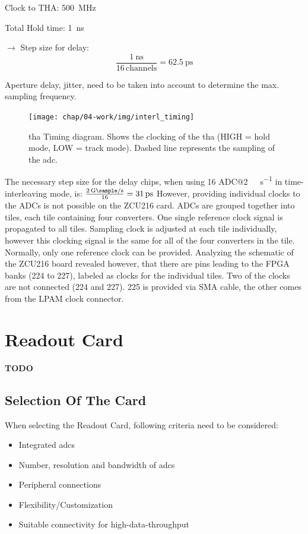 Clock to THA: \SI{500}{\mega \hertz}

Total Hold time: \SI{1}{\nano \second}

$\rightarrow$ Step size for delay:
\begin{equation}
	\frac{\SI{1}{\nano \second}}{16 \, \text{channels}} = \SI{62.5}{\pico \second}
\end{equation}

Aperture delay, jitter, need to be taken into account to determine the max. sampling frequency.
\begin{figure}
	\centering
	\tikzexternaldisable
	\texttt{[image: chap/04-work/img/interl\_timing]}
	\tikzexternalenable
	\caption[Track-And-Hold Timing diagram]{\gls{tha} Timing diagram. Shows the clocking of the \gls{tha} (HIGH = hold mode, LOW = track mode). Dashed line represents the sampling of the \gls{adc}.}
	\label{fig:THA}
\end{figure}

The necessary step size for the delay chips, when using 16 ADC@\SI{2}{\giga \sample \per \second} in time-interleaving mode, is: $\frac{\SI{2}{\giga \sample \per \second}}{16} = \SI{31}{\pico \second}$
However, providing individual clocks to the ADCs is not possible on the ZCU216 card. ADCs are grouped together into tiles, each tile containing four converters. One single reference clock signal is propagated to all tiles. Sampling clock is adjusted at each tile individually, however this clocking signal is the same for all of the four converters in the tile. Normally, only one reference clock can be provided. Analyzing the schematic of the ZCU216 board revealed however, that there are pins leading to the FPGA banks (224 to 227), labeled as clocks for the individual tiles. Two of the clocks are not connected (224 and 227). 225 is provided via SMA cable, the other comes from the LPAM clock connector. 

\section{Readout Card}
\textbf{TODO}
\subsection{Selection Of The Card}\label{sec:selection}
When selecting the Readout Card, following criteria need to be considered:
\begin{itemize}
	\item Integrated \glspl{adc}
	\item Number, resolution and bandwidth of \glspl{adc}
	\item Peripheral connections
	\item Flexibility/Customization
	\item Suitable connectivity for high-data-throughput
\end{itemize}

